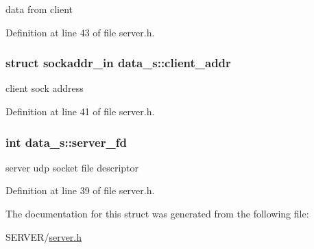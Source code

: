 data from client 



Definition at line 43 of file server.\-h.

\hypertarget{structdata__s_a51ad65b735ac28716f75a66677dec9bb}{
\subsubsection[{client\-\_\-addr}]{\setlength{\rightskip}{0pt plus 5cm}struct sockaddr\-\_\-in data\-\_\-s\-::client\-\_\-addr}}\label{structdata__s_a51ad65b735ac28716f75a66677dec9bb}


client sock address 



Definition at line 41 of file server.\-h.

\hypertarget{structdata__s_a78aaeb875fb9670cbeb1269fee39dd40}{
\subsubsection[{server\-\_\-fd}]{\setlength{\rightskip}{0pt plus 5cm}int data\-\_\-s\-::server\-\_\-fd}}\label{structdata__s_a78aaeb875fb9670cbeb1269fee39dd40}


server udp socket file descriptor 



Definition at line 39 of file server.\-h.



The documentation for this struct was generated from the following file\-:\begin{DoxyCompactItemize}
\item 
S\-E\-R\-V\-E\-R/\hyperlink{server_8h}{server.\-h}\end{DoxyCompactItemize}

